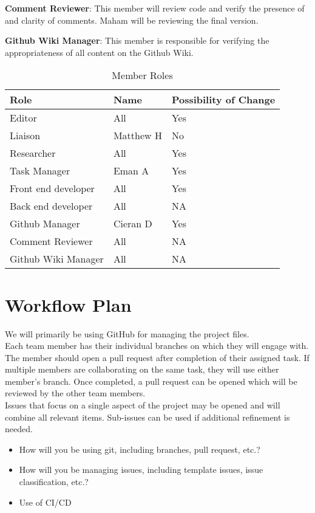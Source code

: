 \documentclass{article}
\begin{document}
\textbf{Comment Reviewer}: This member will review code and verify the presence of and clarity of comments. Maham will be reviewing the final version.

\textbf{Github Wiki Manager}: This member is responsible for verifying the appropriateness of all content on the Github Wiki.

\begin{table}[hp]
\caption{Member Roles} \label{Proposed Assignments}
\begin{tabularx}{\textwidth}{llX}
\toprule
\textbf{Role} & \textbf{Name} & \textbf{Possibility of Change}\\
\midrule
Editor & All & Yes\\
Liaison & Matthew H  & No\\
Researcher & All & Yes \\
Task Manager & Eman A & Yes \\
Front end developer & All & Yes \\
Back end developer & All & NA \\
Github Manager & Cieran D & Yes \\
Comment Reviewer & All & NA \\
Github Wiki Manager & All & NA \\
\bottomrule
\end{tabularx}
\end{table}



\section{Workflow Plan}

We will primarily be using GitHub for managing the project files. \\
Each team member has their individual branches on which they will engage with. 
The member should open a pull request after completion of their assigned task. If 
multiple members are collaborating on the same task, they will use either member's branch. Once completed, 
a pull request can be opened which will be reviewed by the other team members. \\

Issues that focus on a single aspect of the project may be opened and will combine
all relevant items. Sub-issues can be used if additional refinement is needed.


\begin{itemize}
	\item How will you be using git, including branches, pull request, etc.?
	\item How will you be managing issues, including template issues, issue
	classification, etc.?
  \item Use of CI/CD
\end{itemize}
\end{document}
